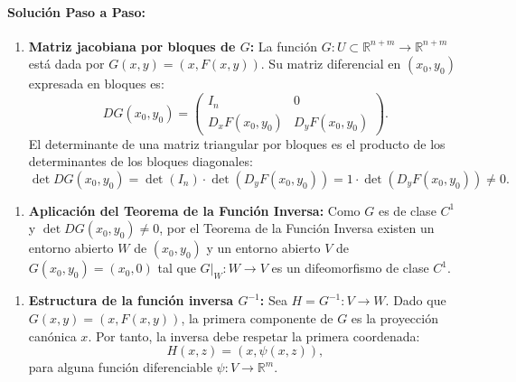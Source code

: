 \documentclass[11pt,a4paper]{article}
\begin{document}
\paragraph{Solución Paso a Paso:}\par
\begin{enumerate}[label=\textbf{\arabic*.}]
\item \textbf{Matriz jacobiana por bloques de $G$:}
La función $G: U \subset \mathbb{R}^{n+m} \to \mathbb{R}^{n+m}$ está dada por $G(x,y) = (x, F(x,y))$.
Su matriz diferencial en $(x_0, y_0)$ expresada en bloques es:
\begin{equation*}
DG(x_0, y_0) = \begin{pmatrix} I_n & 0 \\ D_x F(x_0, y_0) & D_y F(x_0, y_0) \end{pmatrix}.
\end{equation*}
El determinante de una matriz triangular por bloques es el producto de los determinantes de los bloques diagonales:
\begin{equation*}
\det DG(x_0, y_0) = \det(I_n) \cdot \det(D_y F(x_0, y_0)) = 1 \cdot \det(D_y F(x_0, y_0)) \neq 0.
\end{equation*}
\end{enumerate}

\begin{enumerate}[label=\textbf{\arabic*.}]
\item \textbf{Aplicación del Teorema de la Función Inversa:}
Como $G$ es de clase $C^1$ y $\det DG(x_0, y_0) \neq 0$, por el Teorema de la Función Inversa existen un entorno abierto $W$ de $(x_0, y_0)$ y un entorno abierto $V$ de $G(x_0, y_0) = (x_0, 0)$ tal que $G|_W: W \to V$ es un difeomorfismo de clase $C^1$.
\end{enumerate}

\begin{enumerate}[label=\textbf{\arabic*.}]
\item \textbf{Estructura de la función inversa $G^{-1}$:}
Sea $H = G^{-1}: V \to W$. Dado que $G(x,y) = (x, F(x,y))$, la primera componente de $G$ es la proyección canónica $x$.
Por tanto, la inversa debe respetar la primera coordenada:
\begin{equation*}
H(x, z) = (x, \psi(x, z)),
\end{equation*}
para alguna función diferenciable $\psi: V \to \mathbb{R}^m$.
\end{enumerate}
\end{document}
